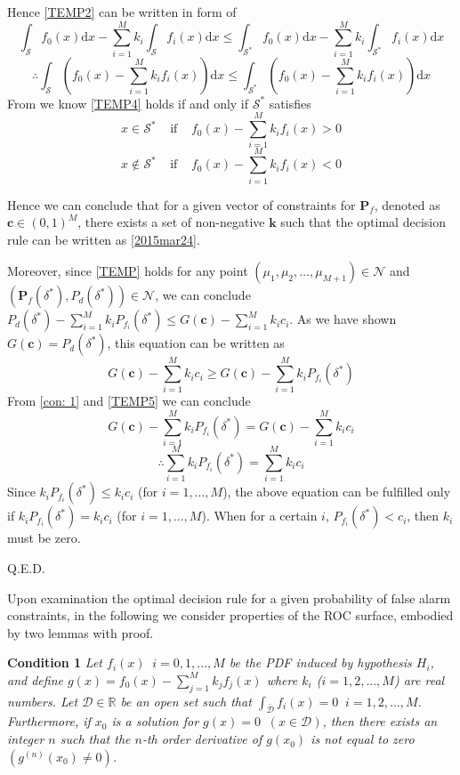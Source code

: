 Hence  \eqref{TEMP2} can be written in form of  
\[
\int_{\mathcal{S}}f_{0}(x)\mathrm{d}x - \sum_{i=1}^{M}k_i\int_{\mathcal{S}}f_i(x)\mathrm{d}x \leq \int_{\mathcal{S}^\ast}f_{0}(x)\mathrm{d}x - \sum_{i=1}^{M}k_i\int_{\mathcal{S}^\ast}f_i(x)\mathrm{d}x
\]
\begin{equation}
\label{TEMP4}
\therefore \int_{\mathcal{S}}(f_{0}(x)- \sum_{i=1}^{M}k_if_{i}(x))\mathrm{d}x \leq \int_{\mathcal{S}^\ast}(f_{0}(x)- \sum_{i=1}^{M}k_if_{i}(x))\mathrm{d}x 
\end{equation}
From \cite{LehmannTest, dantzig1951fundamental} we know \eqref{TEMP4} holds if and only if   
 $\mathcal{S}^\ast$ satisfies
\[
x \in \mathcal{S}^\ast\;\;\;\;\text{if}\;\;\;\;f_{0}(x)- \sum_{i=1}^{M}k_if_{i}(x) > 0
\]
\[
x \notin \mathcal{S}^\ast\;\;\;\;\text{if}\;\;\;\;f_{0}(x)- \sum_{i=1}^{M}k_if_{i}(x) < 0
\]

Hence we can conclude that for a given vector of constraints for $\mathbf{P}_f$, denoted as $\mathbf{c} \in (0, 1)^M$, there exists a set of non-negative $\mathbf{k}$ such that 
the optimal decision rule can be written as \eqref{2015mar24}.  

Moreover, since \eqref{TEMP} holds for any point $(\mu_1, \mu_2, ..., \mu_{M+1}) \in \mathcal{N}$ and $(\mathbf{P}_f(\delta^\ast), P_d(\delta^\ast)) \in \mathcal{N}$, we can conclude 
$P_d(\delta^\ast) - \sum_{i=1}^{M}k_iP_{f_i}(\delta^\ast) \leq G(\mathbf{c}) - \sum_{i=1}^{M}k_ic_i$.
As we have shown $G(\mathbf{c}) = P_d(\delta^\ast)$, this equation can be written as
\begin{equation}
 G(\mathbf{c}) - \sum_{i=1}^{M}k_ic_i \geq G(\mathbf{c}) - \sum_{i=1}^{M}k_iP_{f_i}(\delta^\ast)
\label{TEMP5}
\end{equation}
From \eqref{con: 1} and \eqref{TEMP5}  we can conclude
\[
G(\mathbf{c}) - \sum_{i=1}^{M}k_iP_{f_i}(\delta^\ast) =  G(\mathbf{c}) - \sum_{i=1}^{M}k_ic_i
\]
\[
\therefore  \sum_{i=1}^{M}k_iP_{f_i}(\delta^\ast) =  \sum_{i=1}^{M}k_ic_i
\]
Since $k_iP_{f_i}(\delta^\ast) \leq k_ic_i$ (for $i=1, ..., M$), the above equation can be fulfilled only if $k_iP_{f_i}(\delta^\ast) = k_ic_i$ (for $i=1, ..., M$). When for a certain $i$, $P_{f_i}(\delta^\ast) < c_i$, then $k_i$ must be zero.

Q.E.D.

Upon examination  the optimal decision rule for a given probability of false alarm constraints, in the following we consider properties of the ROC surface, embodied by two lemmas with proof.  

\noindent \textbf{Condition 1}
\textit{
\noindent Let $f_i(x) \;\;i=0, 1, ..., M$ be the PDF induced by hypothesis $H_i$, and define $g(x) = f_0(x) - \sum_{j=1}^{M} k_jf_j(x)$ where $k_i$  ($i = 1, 2, ..., M$) are real numbers. Let $\mathcal{D} \in \mathbb{R}$ be an open set such that $\int_{\bar{\mathcal{D}}}f_i(x)=0\;\;i = 1, 2, ..., M$. Furthermore,  if $x_0$ is a solution  for $g(x) = 0 \;\;(x \in \mathcal{D})$, then there exists an integer $n$ such that  the $n$-th order derivative of $g(x_0)$ is not equal to zero $(g^{(n)}(x_0) \neq 0)$.
}

